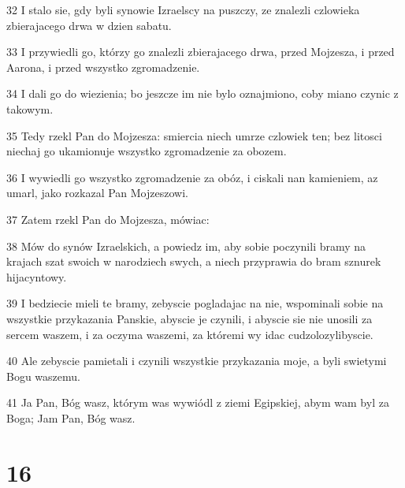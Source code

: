 \par 32 I stalo sie, gdy byli synowie Izraelscy na puszczy, ze znalezli czlowieka zbierajacego drwa w dzien sabatu.
\par 33 I przywiedli go, którzy go znalezli zbierajacego drwa, przed Mojzesza, i przed Aarona, i przed wszystko zgromadzenie.
\par 34 I dali go do wiezienia; bo jeszcze im nie bylo oznajmiono, coby miano czynic z takowym.
\par 35 Tedy rzekl Pan do Mojzesza: smiercia niech umrze czlowiek ten; bez litosci niechaj go ukamionuje wszystko zgromadzenie za obozem.
\par 36 I wywiedli go wszystko zgromadzenie za obóz, i ciskali nan kamieniem, az umarl, jako rozkazal Pan Mojzeszowi.
\par 37 Zatem rzekl Pan do Mojzesza, mówiac:
\par 38 Mów do synów Izraelskich, a powiedz im, aby sobie poczynili bramy na krajach szat swoich w narodziech swych, a niech przyprawia do bram sznurek hijacyntowy.
\par 39 I bedziecie mieli te bramy, zebyscie pogladajac na nie, wspominali sobie na wszystkie przykazania Panskie, abyscie je czynili, i abyscie sie nie unosili za sercem waszem, i za oczyma waszemi, za któremi wy idac cudzolozylibyscie.
\par 40 Ale zebyscie pamietali i czynili wszystkie przykazania moje, a byli swietymi Bogu waszemu.
\par 41 Ja Pan, Bóg wasz, którym was wywiódl z ziemi Egipskiej, abym wam byl za Boga; Jam Pan, Bóg wasz.

\chapter{16}

